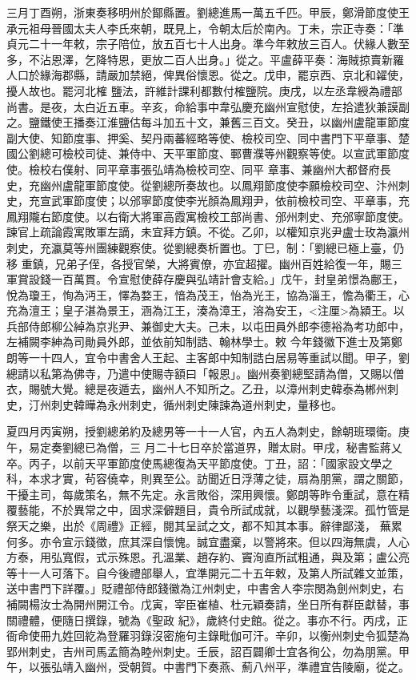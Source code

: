 \begin{pinyinscope}
 三月丁酉朔，浙東奏移明州於鄮縣置。劉總進馬一萬五千匹。甲辰，鄭滑節度使王承元祖母晉國太夫人李氏來朝，既見上，令朝太后於南內。丁未，宗正寺奏：「準貞元二十一年敕，宗子陪位，放五百七十人出身。準今年敕放三百人。伏緣人數至多，不沾恩澤，乞降特恩，更放二百人出身。」從之。平盧薛平奏：海賊掠賣新羅人口於緣海郡縣，請嚴加禁絕，俾異俗懷恩。從之。戊申，罷京西、京北和糴使，擾人故也。罷河北榷
 鹽法，許維計課利都數付榷鹽院。庚戌，以左丞韋綬為禮部尚書。是夜，太白近五車。辛亥，命給事中韋弘慶充幽州宣慰使，左拾遣狄兼謨副之。鹽鐵使王播奏江淮鹽估每斗加五十文，兼舊三百文。癸丑，以幽州盧龍軍節度副大使、知節度事、押奚、契丹兩蕃經略等使、檢校司空、同中書門下平章事、楚國公劉總可檢校司徒、兼侍中、天平軍節度、鄆曹濮等州觀察等使。以宣武軍節度使。檢校右僕射、同平章事張弘靖為檢校司空、同平
 章事、兼幽州大都督府長史，充幽州盧龍軍節度使。從劉總所奏故也。以鳳翔節度使李願檢校司空、汴州刺史，充宣武軍節度使；以邠寧節度使李光顏為鳳翔尹，依前檢校司空、平章事，充鳳翔隴右節度使。以右衛大將軍高霞寓檢校工部尚書、邠州刺史、充邠寧節度使。諫官上疏論霞寓敗軍左謫，未宜拜方鎮。不從。乙卯，以權知京兆尹盧士玫為瀛州刺史，充瀛莫等州團練觀察使。從劉總奏析置也。丁巳，制：「劉總已極上臺，仍移
 重鎮，兄弟子侄，各授官榮，大將賓僚，亦宜超擢。幽州百姓給復一年，賜三軍賞設錢一百萬貫。令宣慰使薛存慶與弘靖計會支給。」戊午，封皇弟憬為鄜王，悅為瓊王，恂為沔王，懌為婺王，愔為茂王，怡為光王，協為淄王，憺為衢王，心充為澶王；皇子湛為景王，涵為江王，湊為漳王，溶為安王，<注厘>為潁王。以兵部侍郎柳公綽為京兆尹、兼御史大夫。己未，以屯田員外郎李德裕為考功郎中，左補闕李紳為司勛員外郎，並依前知制誥、翰林學士。敕
 今年錢徽下進士及第鄭朗等一十四人，宜令中書舍人王起、主客郎中知制誥白居易等重試以聞。甲子，劉總請以私第為佛寺，乃遣中使賜寺額曰「報恩」。幽州奏劉總堅請為僧，又賜以僧衣，賜號大覺。總是夜遁去，幽州人不知所之。乙丑，以漳州刺史韓泰為郴州刺史，汀州刺史韓曄為永州刺史，循州刺史陳諫為道州刺史，量移也。



 夏四月丙寅朔，授劉總弟約及總男等一十一人官，內五人為刺史，餘朝班環衛。庚午，易定奏劉總已為僧，三
 月二十七日卒於當道界，贈太尉。甲戌，秘書監蔣乂卒。丙子，以前天平軍節度使馬總復為天平節度使。丁丑，詔：「國家設文學之科，本求才實，茍容僥幸，則異至公。訪聞近日浮薄之徒，扇為朋黨，謂之關節，干擾主司，每歲策名，無不先定。永言敗俗，深用興懷。鄭朗等昨令重試，意在精覆藝能，不於異常之中，固求深僻題目，貴令所試成就，以觀學藝淺深。孤竹管是祭天之樂，出於《周禮》正經，閱其呈試之文，都不知其本事。辭律鄙淺，
 蕪累何多。亦令宣示錢徵，庶其深自懷愧。誠宜盡棄，以警將來。但以四海無虞，人心方泰，用弘寬假，式示殊恩。孔溫業、趙存約、竇洵直所試粗通，與及第；盧公亮等十一人可落下。自今後禮部舉人，宜準開元二十五年敕，及第人所試雜文並策，送中書門下詳覆。」貶禮部侍郎錢徽為江州刺史，中書舍人李宗閔為劍州刺史，右補闕楊汝士為開州開江令。戊寅，宰臣崔植、杜元穎奏請，坐日所有群臣獻替，事關禮體，便隨日撰錄，號為《聖政
 紀》，歲終付史館。從之。事亦不行。丙戌，正衙命使冊九姓回紇為登羅羽錄沒密施句主錄毗伽可汗。辛卯，以衡州刺史令狐楚為郢州刺史，吉州司馬孟簡為睦州刺史。壬辰，詔百闢卿士宜各徇公，勿為朋黨。甲午，以張弘靖入幽州，受朝賀。中書門下奏燕、薊八州平，準禮宜告陵廟，從之。




\end{pinyinscope}
